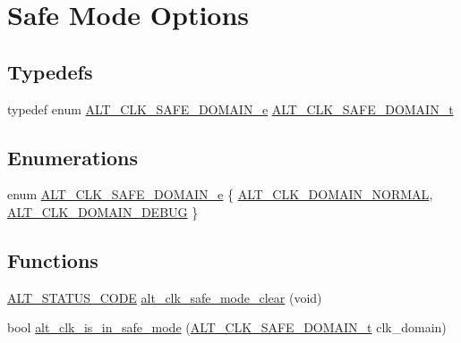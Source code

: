 \hypertarget{group__CLK__MGR__SAFE__MODE}{}\section{Safe Mode Options}
\label{group__CLK__MGR__SAFE__MODE}
\subsection*{Typedefs}
\begin{DoxyCompactItemize}
\item 
typedef enum \mbox{\hyperlink{group__CLK__MGR__SAFE__MODE_ga8feb75a3bd96f3d639ed8052133c9029}{A\+L\+T\+\_\+\+C\+L\+K\+\_\+\+S\+A\+F\+E\+\_\+\+D\+O\+M\+A\+I\+N\+\_\+e}} \mbox{\hyperlink{group__CLK__MGR__SAFE__MODE_gacf9924b29261719c075137e2805f8d3f}{A\+L\+T\+\_\+\+C\+L\+K\+\_\+\+S\+A\+F\+E\+\_\+\+D\+O\+M\+A\+I\+N\+\_\+t}}
\end{DoxyCompactItemize}
\subsection*{Enumerations}
\begin{DoxyCompactItemize}
\item 
enum \mbox{\hyperlink{group__CLK__MGR__SAFE__MODE_ga8feb75a3bd96f3d639ed8052133c9029}{A\+L\+T\+\_\+\+C\+L\+K\+\_\+\+S\+A\+F\+E\+\_\+\+D\+O\+M\+A\+I\+N\+\_\+e}} \{ \mbox{\hyperlink{group__CLK__MGR__SAFE__MODE_gga8feb75a3bd96f3d639ed8052133c9029ae0c540cb09d7d1a2c7ec1456245cd61d}{A\+L\+T\+\_\+\+C\+L\+K\+\_\+\+D\+O\+M\+A\+I\+N\+\_\+\+N\+O\+R\+M\+AL}}, 
\mbox{\hyperlink{group__CLK__MGR__SAFE__MODE_gga8feb75a3bd96f3d639ed8052133c9029a3c53d968ed9db9bebdb74c8b350a99ef}{A\+L\+T\+\_\+\+C\+L\+K\+\_\+\+D\+O\+M\+A\+I\+N\+\_\+\+D\+E\+B\+UG}}
 \}
\end{DoxyCompactItemize}
\subsection*{Functions}
\begin{DoxyCompactItemize}
\item 
\mbox{\hyperlink{hwlib_8h_abdb0d369f069723ca55d6c94bcaaaa12}{A\+L\+T\+\_\+\+S\+T\+A\+T\+U\+S\+\_\+\+C\+O\+DE}} \mbox{\hyperlink{group__CLK__MGR__SAFE__MODE_ga7fb95d9c6bf7e2ec7c96b0c1ab65dc6c}{alt\+\_\+clk\+\_\+safe\+\_\+mode\+\_\+clear}} (void)
\item 
bool \mbox{\hyperlink{group__CLK__MGR__SAFE__MODE_gada82c454b74519f10ce1769e1273608a}{alt\+\_\+clk\+\_\+is\+\_\+in\+\_\+safe\+\_\+mode}} (\mbox{\hyperlink{group__CLK__MGR__SAFE__MODE_gacf9924b29261719c075137e2805f8d3f}{A\+L\+T\+\_\+\+C\+L\+K\+\_\+\+S\+A\+F\+E\+\_\+\+D\+O\+M\+A\+I\+N\+\_\+t}} clk\+\_\+domain)
\end{DoxyCompactItemize}



